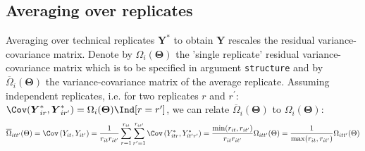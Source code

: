 \documentclass[12pt]{article}
\newcommand{\param}{\Theta}
\newcommand{\Vparam}{\boldsymbol{\param}}
\newcommand{\VY}{\boldsymbol{Y}}
\begin{document}
\subsection{Averaging over replicates}
\label{sec:orga815eba}

Averaging over technical replicates \(\VY^*\) to obtain \(\VY\)
rescales the residual variance-covariance matrix. Denote by
\(\Omega_i(\Vparam)\) the 'single replicate' residual
variance-covariance matrix which is to be specified in argument
\texttt{structure} and by \(\overline{\Omega}_i(\Vparam)\) the
variance-covariance matrix of the average replicate. Assuming
independent replicates, i.e.  for two replicates \(r\) and
\(r^{\prime}\):
\(\Cov(\VY^*_{ir},\VY^*_{ir^{\prime}})=\Omega_i(\Vparam)
\Ind[r=r^{\prime}]\), we can relate \(\overline{\Omega}_i(\Vparam)\)
to \(\Omega_i(\Vparam)\):
\begin{align*}
\overline{\Omega}_{itt^{\prime}}(\Theta) = \Cov\left(Y_{it},Y_{it^{\prime}}\right)=\frac{1}{r_{it}r_{it^{\prime}}}\sum_{r=1}^{r_{it}}\sum_{r^{\prime}=1}^{r_{it^{\prime}}}\Cov\left(Y^*_{itr},Y^*_{it^{\prime}r^{\prime}}\right)
=\frac{\min(r_{it},r_{it^{\prime}})}{r_{it}r_{it^{\prime}}}\Omega_{itt^{\prime}}(\Theta)
=\frac{1}{\max(r_{it},r_{it^{\prime}})}\Omega_{itt^{\prime}}(\Theta)
\end{align*}
\end{document}
